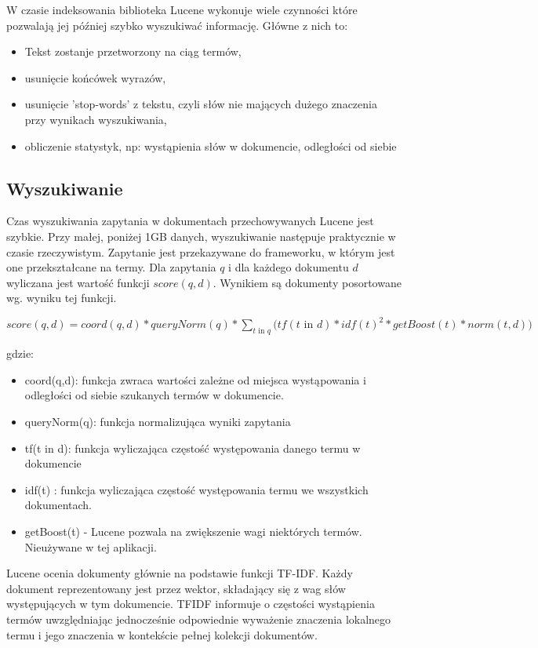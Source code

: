 W czasie indeksowania biblioteka Lucene wykonuje wiele czynności które pozwalają jej później szybko wyszukiwać informację. Główne z nich to:
\begin{itemize}
\item Tekst zostanje przetworzony na ciąg termów,
\item usunięcie końcówek wyrazów,
\item usunięcie 'stop-words' z tekstu, czyli słów nie mających dużego znaczenia przy wynikach wyszukiwania,
\item obliczenie statystyk, np: wystąpienia słów w dokumencie, odległości od siebie
\end{itemize}

\subsection{Wyszukiwanie}

Czas wyszukiwania zapytania w dokumentach przechowywanych Lucene jest szybkie. Przy małej, poniżej 1GB danych, wyszukiwanie następuje praktycznie w czasie rzeczywistym. Zapytanie jest przekazywane do frameworku, w którym jest one przekształcane na termy. Dla zapytania $q$ i dla każdego dokumentu $d$ wyliczana jest wartość funkcji $score(q,d)$. Wynikiem są dokumenty posortowane wg. wyniku tej funkcji.

$score(q,d) =   coord(q,d)  *  queryNorm(q) * \sum_{t \text{ in } q}  \bigg( tf(t\text{ in } d)  *  idf(t)^2  *  getBoost(t) *  norm(t,d) )$

gdzie:
\begin{itemize}
	\item coord(q,d): funkcja zwraca wartości zależne od miejsca wystąpowania i odległości od siebie szukanych termów w dokumencie.
	\item queryNorm(q): funkcja normalizująca wyniki zapytania
	\item tf(t in d): funkcja wyliczająca częstość występowania danego termu w dokumencie
	\item idf(t) : funkcja wyliczająca częstość występowania termu we wszystkich dokumentach.
	\item getBoost(t) - Lucene pozwala na zwiększenie wagi niektórych termów. Nieużywane w tej aplikacji.
\end{itemize}

Lucene ocenia dokumenty głównie na podstawie funkcji TF-IDF. Każdy dokument reprezentowany jest przez wektor, składający się z wag słów występujących w tym dokumencie. TFIDF informuje o częstości wystąpienia termów uwzględniając jednocześnie odpowiednie wyważenie znaczenia lokalnego termu i jego znaczenia w kontekście pełnej kolekcji dokumentów.

